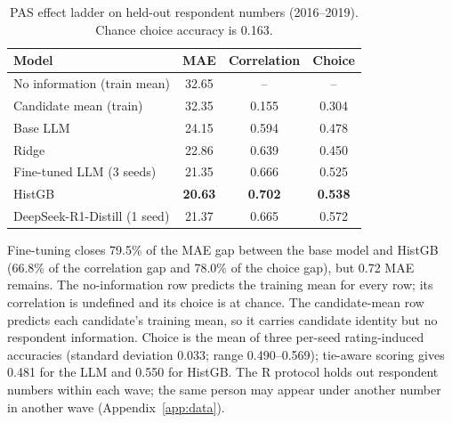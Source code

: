 \begin{table}[t]
\centering
\small
\caption{PAS effect ladder on held-out respondent numbers (2016--2019).
Chance choice accuracy is 0.163.}
\label{tab:pas}
\begin{tabular}{lccc}
\toprule
Model & MAE & Correlation & Choice \\
\midrule
No information (train mean) & 32.65 & -- & -- \\
Candidate mean (train) & 32.35 & 0.155 & 0.304 \\
Base LLM & 24.15 & 0.594 & 0.478 \\
Ridge & 22.86 & 0.639 & 0.450 \\
Fine-tuned LLM (3 seeds) & 21.35 & 0.666 & 0.525 \\
HistGB & \textbf{20.63} & \textbf{0.702} & \textbf{0.538} \\
DeepSeek-R1-Distill (1 seed) & 21.37 & 0.665 & 0.572 \\
\bottomrule
\end{tabular}
\par\smallskip\footnotesize
Fine-tuning closes 79.5\% of the MAE gap between the base model and HistGB
(66.8\% of the correlation gap and 78.0\% of the choice gap), but 0.72 MAE remains.
The no-information row predicts the training mean for every row; its correlation
is undefined and its choice is at chance. The candidate-mean row predicts each
candidate's training mean, so it carries candidate identity but no respondent
information. Choice is the mean of three per-seed
rating-induced accuracies (standard deviation 0.033; range 0.490--0.569);
tie-aware scoring gives 0.481 for the LLM and 0.550 for HistGB. The R protocol
holds out respondent numbers within each wave; the same person may appear under
another number in another wave (Appendix~\ref{app:data}).
\end{table}
